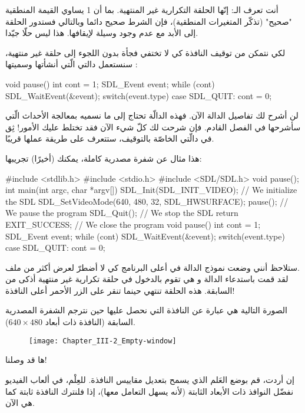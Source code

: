 أنت تعرف الـ:
إنّها الحلقة التكرارية غير المنتهية. بما أن 1 يساوي القيمة المنطقية "صحيح" (تذكّر المتغيرات المنطقية)، فإن الشرط صحيح دائما وبالتالي فستدور الحلقة إلى الأبد مع عدم وجود وسيلة لإيقافها. هذا ليس حلّا جيّدا.

لكي نتمكن من توقيف النافذة كي لا تختفي فجأة بدون اللجوء إلى حلقة غير منتهية، سنستعمل دالتي الّتي أنشأتها وسميتها
:

\begin{Csource}
void pause()
{
	int cont = 1;
	SDL_Event event;
	while (cont)
	{
		SDL_WaitEvent(&event);
		switch(event.type)
		{
			case SDL_QUIT:
			cont = 0;
		}
	}
}
\end{Csource}

لن أشرح لك تفاصيل الدالة الآن. فهذه الدالّة تحتاج إلى ما نسميه بمعالجة الأحداث الّتي سأشرحها في الفصل القادم. فإن شرحت لك كلّ شيء الآن فقد تختلط عليك الأمور! ثِق في دالّتي الخاصّة بالتوقيف، ستتعرف على طريقة عملها قريبًا.

هذا مثال عن شفرة مصدرية كاملة، يمكنك (أخيرًا) تجريبها:

\begin{Csource}
#include <stdlib.h>
#include <stdio.h>
#include <SDL/SDL.h>
void pause();
int main(int argc, char *argv[])
{
	SDL_Init(SDL_INIT_VIDEO); // We initialize the SDL
	SDL_SetVideoMode(640, 480, 32, SDL_HWSURFACE);
	pause(); // We pause the program
	SDL_Quit(); // We stop the SDL
	return EXIT_SUCCESS; // We close the program
}
void pause()
{
	int cont = 1;
	SDL_Event event;
	while (cont)
	{
		SDL_WaitEvent(&event);
		switch(event.type)
		{
			case SDL_QUIT:
			cont = 0;
		}
	}
}
\end{Csource}

ستلاحظ أنني وضعت نموذج الدالة
في أعلى البرنامج كي لا أضطرّ لعرض أكثر من ملف.\\
لقد قمت باستدعاء الدالة 
و هي تقوم بالدخول في حلقة تكرارية غير منتهية أذكى من السابقة. هذه الحلقة تنتهي حينما تنقر على الزر الأحمر 
أعلى النافذة!

الصورة التالية هي عبارة عن النافذة التي نحصل عليها حين نترجم الشفرة المصدرية السابقة (النافذة ذات أبعاد
$640 \times 480$).

\begin{figure}[H]
	\centering
	\texttt{[image: Chapter\_III-2\_Empty-window]}
\end{figure}

ها قد وصلنا!

إن أردت، قم بوضع العَلم الذي يسمح بتعديل مقاييس النافذة. للعِلْم، في ألعاب الفيديو نفضّل النوافذ ذات الأبعاد الثابتة (لأنه يسهل التعامل معها)، إذا فلنترك النافذة ثابتة كما هي الآن.

